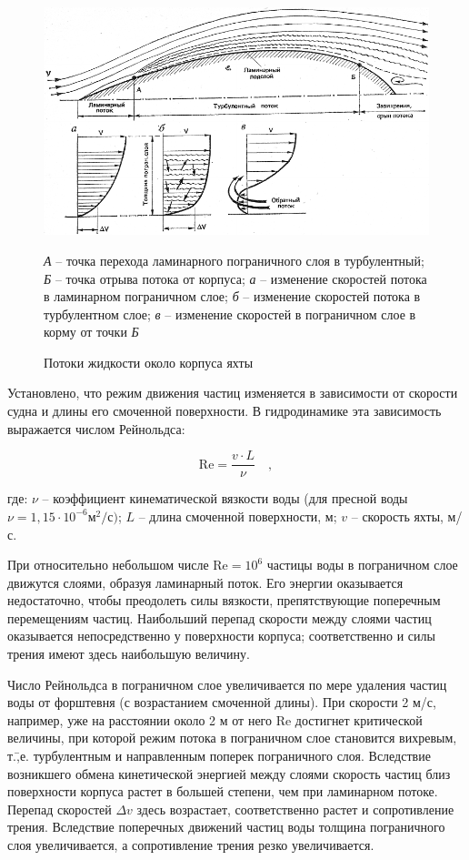 \documentclass[a4paper, 12pt, twoside, final, book, russian, fittopage, cyremdash]{ncc}
\newcommand{\Renum}{\ensuremath{\mathrm {Re}}}
\begin{document}
\begin{figure}[htb]
  \centering
  \includegraphics[scale=1.3]{0014P.pdf}
  \caption{Потоки жидкости около корпуса яхты}
  \label{fig:14}
  \small
  \centering{}
  \textit{А} \--- точка перехода ламинарного пограничного слоя в турбулентный; \textit{Б} \--- точка отрыва потока от корпуса; \textit{а} \--- изменение скоростей потока в ламинарном пограничном слое; \textit{б} \--- изменение скоростей потока в турбулентном слое; \textit{в} \--- изменение скоростей в пограничном слое в корму от точки \textit{Б}
\end{figure}

Установлено, что режим движения частиц изменяется в зависимости от скорости судна и длины его смоченной поверхности. В гидродинамике эта зависимость выражается числом Рейнольдса:

\begin{equation}
  \Renum = \frac{v \cdot L}{\nu} \quad , 
\end{equation}

где: $\nu$ \--- коэффициент кинематической вязкости воды (для пресной воды $\nu = 1,15 \cdot 10^{-6} \text{м}^2/\text{с})$; $L$ \--- длина смоченной поверхности, м; $v$ \--- скорость яхты, м/с. 

При относительно небольшом числе $\Renum = 10^6$ частицы воды в пограничном слое движутся слоями, образуя ламинарный поток. Его энергии оказывается недостаточно, чтобы преодолеть силы вязкости, препятствующие поперечным перемещениям частиц. Наибольший перепад скорости между слоями частиц оказывается непосредственно у поверхности корпуса; соответственно и силы трения имеют здесь наибольшую величину. 

Число Рейнольдса в пограничном слое увеличивается по мере удаления частиц воды от форштевня (с возрастанием смоченной длины). При скорости 2 м/с, например, уже на расстоянии около 2 м от него Re достигнет критической величины, при которой режим потока в пограничном слое становится вихревым, т.\=,е. турбулентным и направленным поперек пограничного слоя. Вследствие возникшего обмена кинетической энергией между слоями скорость частиц близ поверхности корпуса растет в большей степени, чем при ламинарном потоке. Перепад скоростей $\Delta v$ здесь возрастает, соответственно растет и сопротивление трения. Вследствие поперечных движений частиц воды толщина пограничного слоя увеличивается, а сопротивление трения резко увеличивается. 
\end{document}
